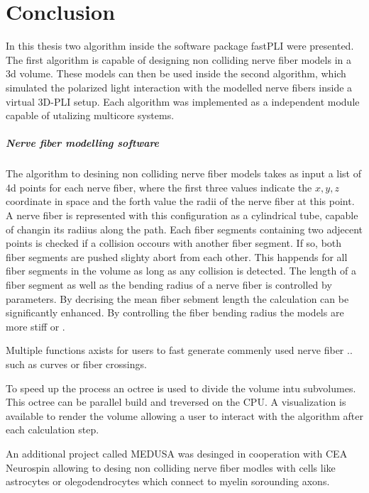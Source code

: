 \chapter{Conclusion}
\label{sec:conclusion}
% 
In this thesis two algorithm inside the software package \ac{fastPLI} were presented.
The first algorithm is capable of designing non colliding nerve fiber models in a 3d volume.
These models can then be used inside the second algorithm, which simulated the polarized light interaction with the modelled nerve fibers inside a virtual \ac{3D-PLI} setup.
Each algorithm was implemented as a independent \python{} module capable of utalizing multicore systems.
% 
\paragraph{Nerve fiber modelling software}
% 
The algorithm to desining non colliding nerve fiber models takes as input a list of 4d points for each nerve fiber, where the first three values indicate the $x,y,z$ coordinate in space and the forth value the radii of the nerve fiber at this point.
A nerve fiber is represented with this configuration as a cylindrical tube, capable of changin its radiius along the path.
Each fiber segments containing two adjecent points is checked if a collision occours with another fiber segment.
If so, both fiber segments are pushed slighty abort from each other.
This happends for all fiber segments in the volume as long as any collision is detected.
The length of a fiber segment as well as the bending radius of a nerve fiber is controlled by parameters.
By decrising the mean fiber sebment length the calculation can be significantly enhanced. 
By controlling the fiber bending radius the models are more stiff or \dummy{}.
\par
Multiple functions axists for users to fast generate commenly used nerve fiber  .. such as curves or fiber crossings.
% 
\par
% 
To speed up the process an octree is used to divide the volume intu subvolumes.
This octree can be parallel build and treversed on the \ac{CPU}.
A visualization is available to render the volume allowing a user to interact with the algorithm after each calculation step.
\par
% 
An additional project called \ac{MEDUSA} was desinged in cooperation with \ac{CEA} Neurospin allowing to desing non colliding nerve fiber modles with cells like astrocytes or olegodendrocytes which connect to myelin sorounding axons.
% 
% 
% 
